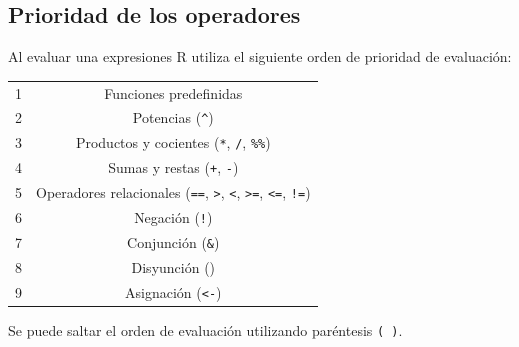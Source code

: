 \documentclass[
  a4paper,
]{scrreport}
\theoremstyle{definition}
\theoremstyle{definition}
\theoremstyle{remark}
\begin{document}
\hypertarget{prioridad-de-los-operadores}{%
\subsection{Prioridad de los
operadores}\label{prioridad-de-los-operadores}}

Al evaluar una expresiones R utiliza el siguiente orden de prioridad de
evaluación:

\begin{longtable}[]{@{}cc@{}}
\toprule()
\endhead
1 & Funciones predefinidas \\
2 & Potencias (\texttt{\^{}}) \\
3 & Productos y cocientes (\texttt{*}, \texttt{/}, \texttt{\%\%}) \\
4 & Sumas y restas (\texttt{+}, \texttt{-}) \\
5 & Operadores relacionales (\texttt{==}, \texttt{\textgreater{}},
\texttt{\textless{}}, \texttt{\textgreater{}=}, \texttt{\textless{}=},
\texttt{!=}) \\
6 & Negación (\texttt{!}) \\
7 & Conjunción (\texttt{\&}) \\
8 & Disyunción (\texttt{\textbar{}}) \\
9 & Asignación (\texttt{\textless{}-}) \\
\bottomrule()
\end{longtable}

Se puede saltar el orden de evaluación utilizando paréntesis
\texttt{(\ )}.
\end{document}

